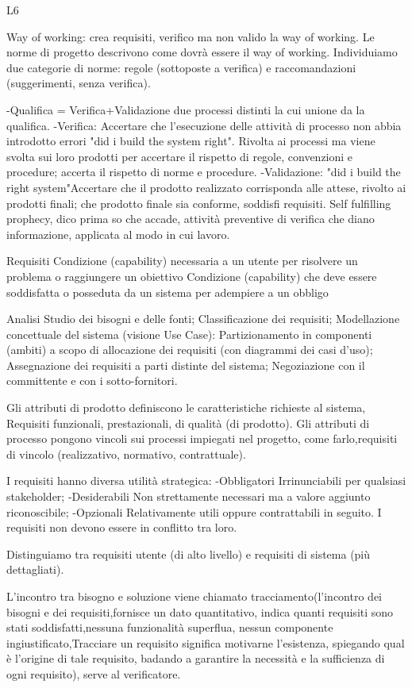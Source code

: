 \documentclass{report}
\begin{document}
L6

Way of working: crea requisiti, verifico ma non valido la way of working.
Le norme di progetto descrivono come dovrà essere il way of working.
Individuiamo due categorie di norme: regole (sottoposte a verifica) e raccomandazioni (suggerimenti, senza verifica).

-Qualifica = Verifica+Validazione due processi distinti la cui unione da la qualifica.
-Verifica: Accertare che l’esecuzione delle attività di processo non abbia introdotto errori "did i build the system right". Rivolta ai processi ma viene svolta sui loro prodotti per accertare il rispetto di regole, convenzioni e procedure; accerta il rispetto di norme e procedure.
-Validazione: "did i build the right system"Accertare che il prodotto realizzato corrisponda alle attese, rivolto ai prodotti finali; che prodotto finale sia conforme, soddisfi requisiti.
Self fulfilling prophecy, dico prima so che accade, attività preventive di verifica che diano informazione, applicata al modo in cui lavoro.

Requisiti
Condizione (capability) necessaria a un utente per risolvere un problema o raggiungere un obiettivo
Condizione (capability) che deve essere soddisfatta o posseduta da un sistema per adempiere a un obbligo

Analisi
Studio dei bisogni e delle fonti;
Classificazione dei requisiti;
Modellazione concettuale del sistema (visione Use Case): Partizionamento in componenti (ambiti) a scopo di allocazione dei requisiti (con diagrammi dei casi d’uso);
Assegnazione dei requisiti a parti distinte del sistema;
Negoziazione con il committente e con i sotto-fornitori.

Gli attributi di prodotto definiscono le caratteristiche richieste al sistema, Requisiti funzionali, prestazionali, di qualità (di prodotto).
Gli attributi di processo pongono vincoli sui processi impiegati nel progetto, come farlo,requisiti di vincolo (realizzativo, normativo, contrattuale).

I requisiti hanno diversa utilità strategica:
-Obbligatori Irrinunciabili per qualsiasi stakeholder;
-Desiderabili Non strettamente necessari ma a valore aggiunto riconoscibile;
-Opzionali Relativamente utili oppure contrattabili in seguito.
I requisiti non devono essere in conflitto tra loro.

Distinguiamo tra requisiti utente (di alto livello) e requisiti di sistema (più dettagliati).

L'incontro tra bisogno e soluzione viene chiamato tracciamento(l’incontro dei bisogni e dei requisiti,fornisce un dato quantitativo, indica quanti requisiti sono stati soddisfatti,nessuna funzionalità superflua, nessun componente ingiustificato,Tracciare un requisito significa motivarne l’esistenza, spiegando qual è l’origine di tale requisito, badando a garantire la necessità e la sufficienza di ogni requisito), serve al verificatore.
\end{document}
